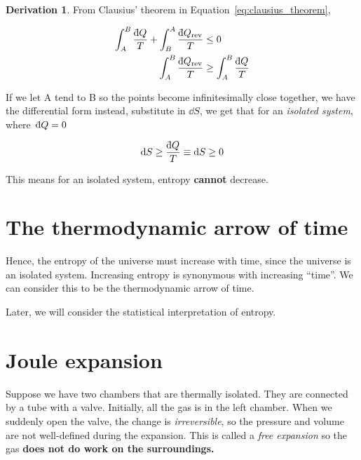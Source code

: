 \documentclass[12pt,chapterprefix=false,dvipsnames]{scrbook}
\theoremstyle{dotless}
\theoremstyle{definition}
\newtheorem{protoderivation}{Derivation}[section]
\newenvironment{derivation}
{\colorlet{shadecolor}{purple!15}\begin{shaded}\begin{protoderivation}}
			{\end{protoderivation}\end{shaded}}
\def\dbar{{\mathchar'26\mkern-10mu \mathrm{d}}}
\begin{document}
\begin{derivation}

	From Clausius' theorem in Equation~\ref{eq:clausius_theorem},

	\begin{equation}
		\begin{aligned}
			\int_A^B \frac{\dbar Q}{T} + \int_B^A
			\frac{\dbar Q_{\mathrm{rev}}}{T}          & \leq 0        \\
			\int_A^B \frac{\dbar Q_{\mathrm{rev}}}{T} & \geq \int_A^B
			\frac{\dbar Q}{T}
		\end{aligned}
	\end{equation}

	If we let A tend to B so the points become infinitesimally close
	together, we have the differential form instead, substitute in
	$\dd{S}$, we get that for an
	\textit{isolated system}, where\, $\dbar Q = 0$

	\begin{equation}
		\label{eq:entropy_cannot_decrease}
		\dd{S} \geq \frac{\dbar Q}{T} \equiv
		\dd{S} \geq 0
	\end{equation}

	This means for an isolated system, entropy
	\textbf{cannot} decrease.
\end{derivation}

\section{The thermodynamic arrow of time}%
\label{sec:the_thermodynamic_arrow_of_time}

Hence, the entropy of the universe must increase with time,
since the universe is an isolated system. Increasing entropy is
synonymous with increasing ``time''. We can consider this to be
the thermodynamic arrow of time.

Later, we will consider the statistical interpretation of
entropy.

\section{Joule expansion}%
\label{sec:joule_expansion}

Suppose we have two chambers that are thermally isolated. They
are connected by a tube with a valve. Initially, all the gas is
in the left chamber. When we suddenly open the valve, the change
is \textit{irreversible}, so the pressure and volume are not
well-defined during the expansion. This is called a
\textit{free expansion} so the gas \textbf{does not do work on the surroundings.}
\end{document}
